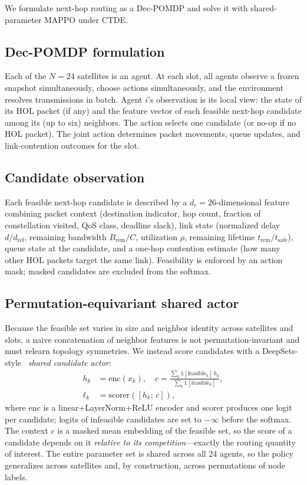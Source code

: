 \documentclass[conference,10pt]{IEEEtran}
\begin{document}
We formulate next-hop routing as a Dec-POMDP and solve it with shared-parameter MAPPO under CTDE.

\subsection{Dec-POMDP formulation}
Each of the $N=24$ satellites is an agent. At each slot, all agents observe a frozen snapshot simultaneously, choose actions simultaneously, and the environment resolves transmissions in batch. Agent $i$'s observation is its local view: the state of its HOL packet (if any) and the feature vector of each feasible next-hop candidate among its (up to six) neighbors. The action selects one candidate (or no-op if no HOL packet). The joint action determines packet movements, queue updates, and link-contention outcomes for the slot.

\subsection{Candidate observation}
Each feasible next-hop candidate is described by a $d_c=26$-dimensional feature combining packet context (destination indicator, hop count, fraction of constellation visited, QoS class, deadline slack), link state (normalized delay $d/d_{\mathrm{ref}}$, remaining bandwidth $B_{\mathrm{rem}}/C$, utilization $\rho$, remaining lifetime $t_{\mathrm{rem}}/t_{\mathrm{safe}}$), queue state at the candidate, and a one-hop contention estimate (how many other HOL packets target the same link). Feasibility is enforced by an action mask; masked candidates are excluded from the softmax.

\subsection{Permutation-equivariant shared actor}
Because the feasible set varies in size and neighbor identity across satellites and slots, a naive concatenation of neighbor features is not permutation-invariant and must relearn topology symmetries. We instead score candidates with a DeepSets-style~\cite{zaheer2017deep} \emph{shared candidate actor}:
\begin{align}
  h_k &= \mathrm{enc}(x_k), \quad c = \tfrac{\sum_k \mathbb{1}[\mathrm{feasible}_k]\, h_k}{\sum_k \mathbb{1}[\mathrm{feasible}_k]},\\
  \ell_k &= \mathrm{scorer}([h_k;\, c]),
\end{align}
where $\mathrm{enc}$ is a linear+LayerNorm+ReLU encoder and $\mathrm{scorer}$ produces one logit per candidate; logits of infeasible candidates are set to $-\infty$ before the softmax. The context $c$ is a masked mean embedding of the feasible set, so the score of a candidate depends on it \emph{relative to its competition}---exactly the routing quantity of interest. The entire parameter set is shared across all 24 agents, so the policy generalizes across satellites and, by construction, across permutations of node labels.
\end{document}
